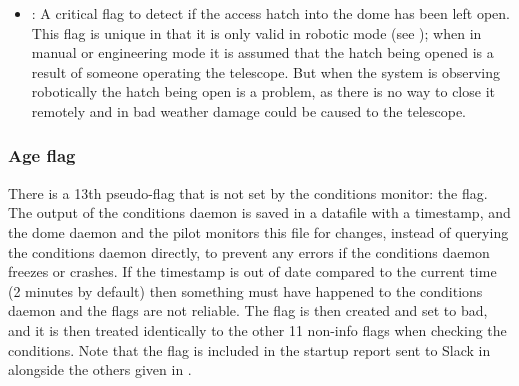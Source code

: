 \begin{colsection}
\begin{itemize}
    \item {}: A critical flag to detect if the access hatch into the dome has been left open. This flag is unique in that it is only valid in robotic mode (see ); when in manual or engineering mode it is assumed that the hatch being opened is a result of someone operating the telescope. But when the system is observing robotically the hatch being open is a problem, as there is no way to close it remotely and in bad weather damage could be caused to the telescope.
\end{itemize}

\subsubsection{Age flag}

There is a 13th pseudo-flag that is not set by the conditions monitor: the  flag. The output of the conditions daemon is saved in a datafile with a timestamp, and the dome daemon and the pilot monitors this file for changes, instead of querying the conditions daemon directly, to prevent any errors if the conditions daemon freezes or crashes. If the timestamp is out of date compared to the current time (2 minutes by default) then something must have happened to the conditions daemon and the flags are not reliable. The  flag is then created and set to bad, and it is then treated identically to the other 11 non-info flags when checking the conditions. Note that the  flag is included in the startup report sent to Slack in  alongside the others given in .

\end{colsection}


